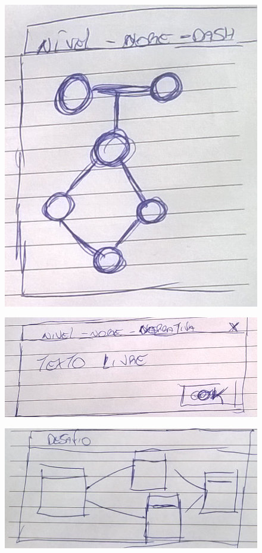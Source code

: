 \documentclass[
	12pt,				%
	oneside,			%
	a4paper,			%
	english,			%
	french,				%
	spanish,			%
	brazil,				%
	]{abntex2}
\begin{document}
\begin{figure}[ht]
\centering
\includegraphics[width=1\textwidth]{imagens/proposta_nivel.png}
\end{figure}

\begin{figure}[ht]
\centering
\includegraphics[width=1\textwidth]{imagens/proposta_narrativa.png}
\end{figure}

\begin{figure}[ht]
\centering
\includegraphics[width=1\textwidth]{imagens/proposta_desafio.png}
\end{figure}
\end{document}
